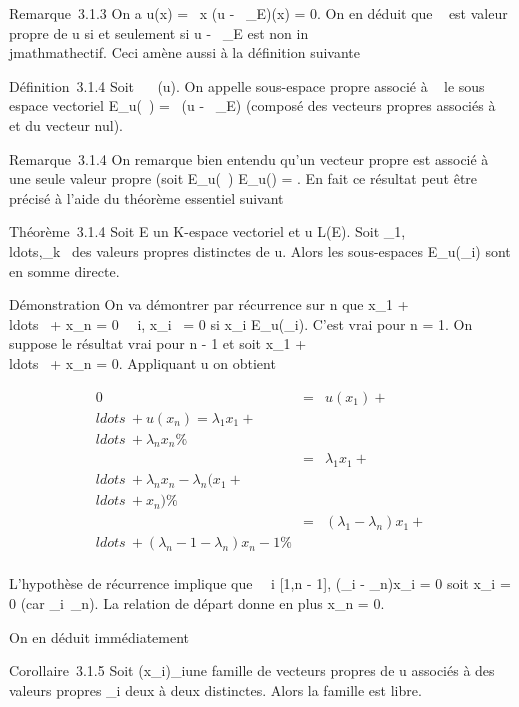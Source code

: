 \documentclass[]{article}
\begin{document}
Remarque~3.1.3 On a u(x) = \lambda~x \Leftrightarrow (u -
\lambda~\mathrmId_E)(x) = 0. On en déduit que \lambda~ est
valeur propre de u si et seulement si u -
\lambda~\mathrmId_E est non in\\jmathmathectif. Ceci amène
aussi à la définition suivante

Définition~3.1.4 Soit \lambda~
\in{}~(u). On appelle
sous-espace propre associé à \lambda~ le sous espace vectoriel E_u(\lambda~)
= \mathrmKer~(u -
\lambda~\mathrmId_E) (composé des vecteurs propres
associés à \lambda~ et du vecteur nul).

Remarque~3.1.4 On remarque bien entendu qu'un vecteur propre est associé
à une seule valeur propre (soit E_u(\lambda~) \bigcap E_u(\mu) =
\0\). En fait ce résultat peut être
précisé à l'aide du théorème essentiel suivant

Théorème~3.1.4 Soit E un K-espace vectoriel et u \in L(E). Soit
\lambda_1,\\ldots,\lambda_k~
des valeurs propres distinctes de u. Alors les sous-espaces
E_u(\lambda_i) sont en somme directe.

Démonstration On va démontrer par récurrence sur n que x_1 +
\\ldots~ +
x_n = 0 \rigtharrow~\forall~i, x_i~ = 0 si
x_i \in E_u(\lambda_i). C'est vrai pour n = 1. On
suppose le résultat vrai pour n - 1 et soit x_1 +
\\ldots~ +
x_n = 0. Appliquant u on obtient

\begin{align*} 0& =& u(x_1) +
\\ldots~ +
u(x_n) = \lambda_1x_1 +
\\ldots~ +
\lambda_nx_n\%& \\ & =&
\lambda_1x_1 +
\\ldots~ +
\lambda_nx_n - \lambda_n(x_1 +
\\ldots~ +
x_n) \%& \\ & =& (\lambda_1
- \lambda_n)x_1 +
\\ldots~ +
(\lambda_n-1 - \lambda_n)x_n-1 \%&
\\ \end{align*}

L'hypothèse de récurrence implique que \forall~~i \in
{[}1,n - 1{]}, (\lambda_i - \lambda_n)x_i = 0 soit
x_i = 0 (car
\lambda_i\neq~\lambda_n). La relation de
départ donne en plus x_n = 0.

On en déduit immédiatement

Corollaire~3.1.5 Soit (x_i)_i\inI une famille de
vecteurs propres de u associés à des valeurs propres \lambda_i deux à
deux distinctes. Alors la famille est libre.
\end{document}
